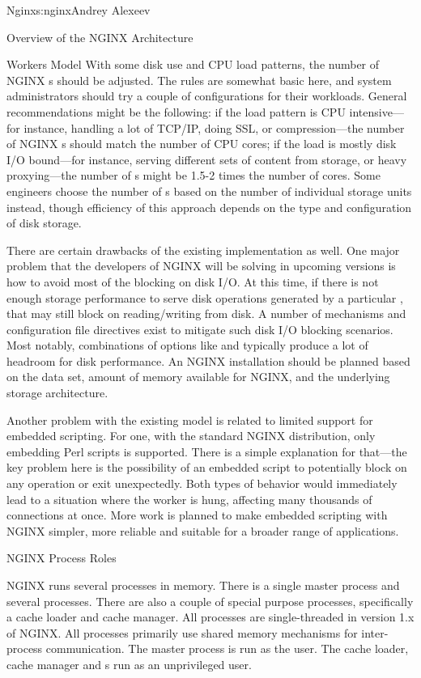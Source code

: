 \begin{aosachapter}{Nginx}{s:nginx}{Andrey Alexeev}
\begin{aosasect1}{Overview of the NGINX Architecture}
\begin{aosasect2}{Workers Model}
With some disk use and CPU load patterns, the number of NGINX
s should be adjusted. The rules are somewhat basic here,
and system administrators should try a couple of configurations for
their workloads. General recommendations might be the following: if
the load pattern is CPU intensive---for instance, handling a lot of
TCP/IP, doing SSL, or compression---the number of NGINX s
should match the number of CPU cores; if the load is mostly disk I/O
bound---for instance, serving different sets of content from storage,
or heavy proxying---the number of s might be 1.5-2
times the number of cores. Some engineers choose the number of
s based on the number of individual storage units
instead, though efficiency of this approach depends on the type and
configuration of disk storage.

There are certain drawbacks of the existing implementation as
well. One major problem that the developers of NGINX will be solving
in upcoming versions is how to avoid most of the blocking on disk
I/O. At this time, if there is not enough storage performance to serve
disk operations generated by a particular , that
 may still block on reading/writing from disk. A number
of mechanisms and configuration file directives exist to mitigate such
disk I/O blocking scenarios. Most notably, combinations of options
like  and  typically produce a lot of
headroom for disk performance. An NGINX installation should be planned
based on the data set, amount of memory available for NGINX, and the
underlying storage architecture.

Another problem with the existing  model is related to
limited support for embedded scripting. For one, with the standard
NGINX distribution, only embedding Perl scripts is supported. There is
a simple explanation for that---the key problem here is the
possibility of an embedded script to potentially block on any
operation or exit unexpectedly. Both types of behavior would
immediately lead to a situation where the worker is hung, affecting
many thousands of connections at once. More work is planned to make
embedded scripting with NGINX simpler, more reliable and suitable for
a broader range of applications.

\end{aosasect2}

\begin{aosasect2}{NGINX Process Roles}

NGINX runs several processes in memory. There is a single master
process and several  processes. There are also a couple
of special purpose processes, specifically a cache loader and cache
manager. All processes are single-threaded in version 1.x of
NGINX. All processes primarily use shared memory mechanisms for
inter-process communication. The master process is run as the
 user. The cache loader, cache manager and s
run as an unprivileged user.


\end{aosasect2}
\end{aosasect1}
\end{aosachapter}
